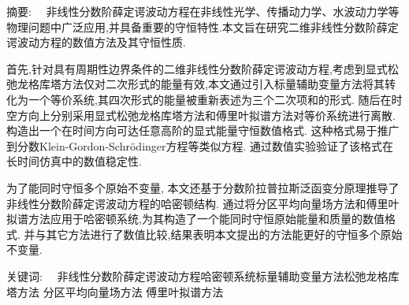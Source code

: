 
\begin{ChineseAbstract}[副教授]%
\item {\heiti 摘要:\ \ }
非线性分数阶薛定谔波动方程在非线性光学、传播动力学、水波动力学等物理问题中广泛应用,并具备重要的守恒特性.本文旨在研究二维非线性分数阶薛定谔波动方程的数值方法及其守恒性质.

首先,针对具有周期性边界条件的二维非线性分数阶薛定谔波动方程,考虑到显式松弛龙格库塔方法仅对二次形式的能量有效,本文通过引入标量辅助变量方法将其转化为一个等价系统,其四次形式的能量被重新表述为三个二次项和的形式.
随后在时空方向上分别采用显式松弛龙格库塔方法和傅里叶拟谱方法对等价系统进行离散. 构造出一个在时间方向可达任意高阶的显式能量守恒数值格式.
这种格式易于推广到分数Klein-Gordon-Schr{\"o}dinger方程等类似方程.
通过数值实验验证了该格式在长时间仿真中的数值稳定性.

为了能同时守恒多个原始不变量, 本文还基于分数阶拉普拉斯泛函变分原理推导了非线性分数阶薛定谔波动方程的哈密顿结构.
通过将分区平均向量场方法和傅里叶拟谱方法应用于哈密顿系统,为其构造了一个能同时守恒原始能量和质量的数值格式.
并与其它方法进行了数值比较,结果表明本文提出的方法能更好的守恒多个原始不变量.

\item {\heiti 关键词:\ \ } 非线性分数阶薛定谔波动方程\qquad 哈密顿系统\qquad 标量辅助变量方法\qquad 松弛龙格库塔方法 \qquad 分区平均向量场方法 \qquad 傅里叶拟谱方法
\end{ChineseAbstract}
